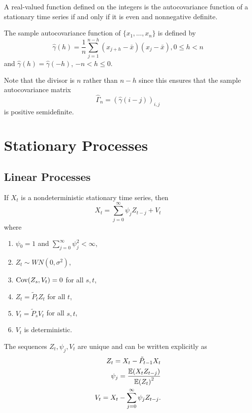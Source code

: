\begin{thm}
  \label{defn:time_series:16}
  A real-valued function defined on the integers is the autocovariance
  function of a stationary time series if and only if it is even and
  nonnegative definite.
\end{thm}

\begin{defn}
  \label{defn:time_series:12}
  The sample autocovariance function of $\{ x_{1}, \dots, x_{n} \}$ is
  defined by
  \begin{equation}
    \label{eq:7}
    \hat \gamma(h) = \frac{1}{n} \sum_{j=1}^{n-h} (x_{j+h} - \bar
    x)(x_{j} - \bar x), 0 \leq h < n
  \end{equation} and $\hat \gamma(h) = \hat \gamma(-h)$, $-n < h \leq
  0$.

  Note that the divisor is $n$ rather than $n-h$ since this ensures
  that the sample autocovariance matrix
  \begin{equation}
    \label{eq:8}
    \hat \Gamma_{n} = (\hat \gamma(i - j))_{i, j}
  \end{equation} is positive semidefinite.
\end{defn}

\section{Stationary Processes}
\label{sec:stationary-processes-1}

\subsection{Linear Processes}
\label{sec:linear-processes}

\begin{defn}
  \label{defn:stationary_processes:1}
  If $X_{t}$ is a nondeterministic stationary time series, then
  \begin{equation}
    \label{eq:9}
    X_{t} = \sum_{j=0}^{\infty} \psi_{j} Z_{t-j} + V_{t}
  \end{equation} where
  \begin{enumerate}
  \item $\psi{_0} = 1$ and $\sum_{j=0}^{\infty} \psi_{j}^{2} <
    \infty$,
  \item $Z_{t} \sim WN(0, \sigma^{2})$,
  \item $\Cov{Z_{s}}{V_{t}} = 0$ for all $s, t$,
  \item $Z_{t} = \tilde P_{t} Z_{t}$ for all $t$,
  \item $V_{t} = \tilde P_{s} V_{t}$ for all $s, t$,
  \item $V_{t}$ is deterministic.
  \end{enumerate}
  The sequences $Z_{t}, \psi_{j}, V_{t}$ are unique and can be written
  explicitly as
  \begin{align}
    \label{eq:9}
    Z_{t} = X_{t} - \tilde P_{t-1} X_{t} \\
    \psi_{j} = \frac{\E{X_{t} Z_{t-j}}}{\E{Z_{t}}^{2}} \\
    V_{t} = X_{t} - \sum_{j=0}^{\infty} \psi_{j} Z_{t-j}.
  \end{align}
\end{defn}

